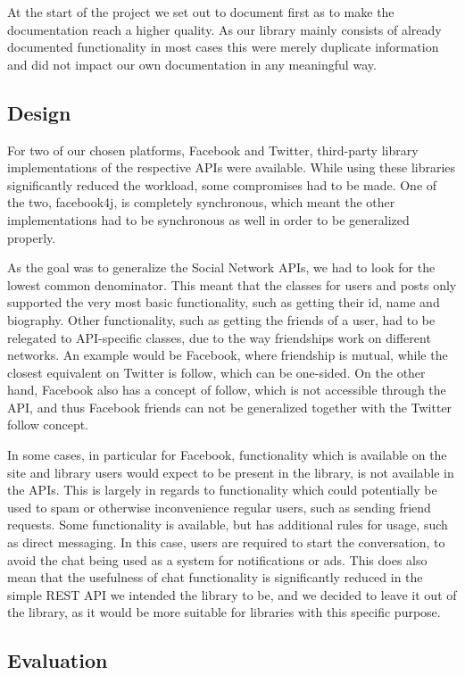 \documentclass{sigchi-alternate}
\begin{document}
At the start of the project we set out to document first as to make the documentation reach a higher quality. As our library mainly consists of already documented functionality in most cases this were merely duplicate
information and did not impact our own documentation in any meaningful way.

\subsection{Design}
For two of our chosen platforms, Facebook and Twitter, third-party library implementations of the respective APIs were available. While using these libraries significantly reduced the workload, some compromises had to
be made. One of the two, facebook4j, is completely synchronous, which meant the other implementations had to be synchronous as well in order to be generalized properly.

As the goal was to generalize the Social Network APIs, we had to look for the lowest common denominator. This meant that the classes for users and posts only supported the very most basic functionality, such as getting
their id, name and biography. Other functionality, such as getting the friends of a user, had to be relegated to API-specific classes, due to the way friendships work on different networks. An example would be Facebook,
where friendship is mutual, while the closest equivalent on Twitter is follow, which can be one-sided. On the other hand, Facebook also has a concept of follow, which is not accessible through the API, and thus Facebook
friends can not be generalized together with the Twitter follow concept.

In some cases, in particular for Facebook, functionality which is available on the site and library users would expect to be present in the library, is not available in the APIs. This is largely in regards to functionality
which could potentially be used to spam or otherwise inconvenience regular users, such as sending friend requests. Some functionality is available, but has additional rules for usage, such as direct messaging. In this case,
users are required to start the conversation, to avoid the chat being used as a system for notifications or ads. This does also mean that the usefulness of chat functionality is significantly reduced in the simple REST API
we intended the library to be, and we decided to leave it out of the library, as it would be more suitable for libraries with this specific purpose.

\subsection{Evaluation}
\end{document}
